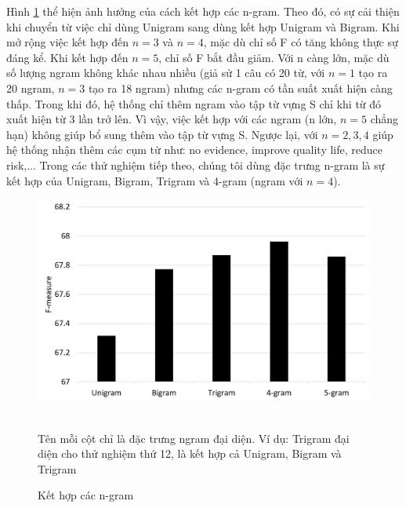 Hình \ref{fig:ket-hop-ngram} thể hiện ảnh hưởng của cách kết hợp các n-gram. Theo đó, có sự cải thiện khi chuyển từ việc chỉ dùng Unigram sang dùng kết hợp Unigram và Bigram. Khi mở rộng việc kết hợp đến $n=3$ và $n=4$, mặc dù chỉ số F có tăng không thực sự đáng kể. Khi kết hợp đến $n=5$, chỉ số F bắt đầu giảm. Với n càng lớn, mặc dù số lượng ngram không khác nhau nhiều (giả sử 1 câu có 20 từ, với $n=1$ tạo ra 20 ngram, $n=3$ tạo ra 18 ngram) nhưng các n-gram có tần suất xuất hiện càng thấp. Trong khi đó, hệ thống chỉ thêm ngram vào tập từ vựng S chỉ khi từ đó xuất hiện từ 3 lần trở lên. Vì vậy, việc kết hợp với các ngram (n lớn, $n=5$ chẳng hạn) không giúp bổ sung thêm vào tập từ vựng S. Ngược lại, với $n=2, 3, 4$ giúp hệ thống nhận thêm các cụm từ như: no evidence, improve quality life, reduce risk,... Trong các thử nghiệm tiếp theo, chúng tôi dùng đặc trưng n-gram là sự kết hợp của Unigram, Bigram, Trigram và 4-gram (ngram với $n=4$).
\begin{figure}[H]
\centering
\begin{minipage}{0.7\textwidth}
\includegraphics[scale=0.25]{../hinh/ket_hop_ngram.png}
{\footnotesize \\
Tên mỗi cột chỉ là đặc trưng ngram đại diện. Ví dụ: Trigram đại diện cho thử nghiệm thứ 12, là kết hợp cả Unigram, Bigram và Trigram \par}
\caption{Kết hợp các n-gram} \label{fig:ket-hop-ngram}
\end{minipage}
\end{figure}


